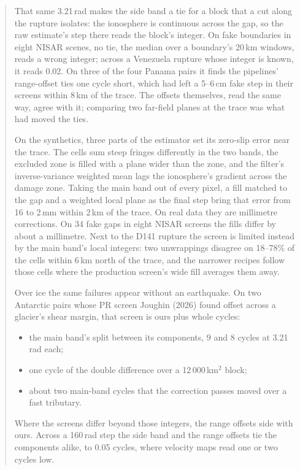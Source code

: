 \begin{abstract}
That same 3.21\,rad makes the side band a tie for a block that a cut along the rupture isolates: the ionosphere is
continuous across the gap, so the raw estimate's step there reads the block's integer. On fake boundaries in eight
NISAR scenes, no tie, the median over a boundary's 20\,km windows, reads a wrong integer; across a Venezuela rupture
whose integer is known, it reads 0.02. On three of the four Panama pairs it finds the pipelines' range-offset ties
one cycle short, which had left a 5--6\,cm fake step in their screens within 8\,km of the trace. The offsets themselves,
read the same way, agree with it; comparing two far-field planes at the trace was what had moved the ties.

On the synthetics, three parts of the estimator set its zero-slip error near the trace. The cells sum steep fringes
differently in the two bands, the excluded zone is filled with a plane wider than the zone, and the filter's
inverse-variance weighted mean lags the ionosphere's gradient across the damage zone. Taking the main band out of every
pixel, a fill matched to the gap and a weighted local plane as the final step bring that error from 16 to 2\,mm within
2\,km of the trace. On real data they are millimetre corrections. On 34 fake gaps in eight NISAR screens the fills
differ by about a millimetre. Next to the D141 rupture the screen is limited instead by the main band's local integers:
two unwrappings disagree on 18--78\% of the cells within 6\,km north of the trace, and the narrower recipes follow
those cells where the production screen's wide fill averages them away.

Over ice the same failures appear without an earthquake. On two Antarctic pairs whose PR screen Joughin (2026) found
offset across a glacier's shear margin, that screen is ours plus whole cycles:
\begin{itemize}
  \item the main band's split between its components, 9 and 8 cycles at 3.21\,rad each;
  \item one cycle of the double difference over a 12\,000\,km$^2$ block;
  \item about two main-band cycles that the correction passes moved over a fast tributary.
\end{itemize}
Where the screens differ beyond those integers, the range offsets side with ours. Across a 160\,rad step the side band
and the range offsets tie the components alike, to 0.05 cycles, where velocity maps read one or two cycles low.
\end{abstract}

